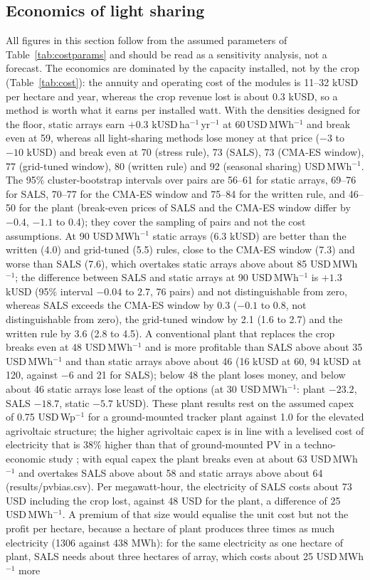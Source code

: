 \subsection{Economics of light sharing}\label{sec:cost}
All figures in this section follow from the assumed parameters of Table~\ref{tab:costparams} and should be read as a sensitivity analysis, not a forecast. The economics are dominated by the capacity installed, not by the crop (Table~\ref{tab:cost}): the annuity and operating cost of the modules is 11--32 kUSD per hectare and year, whereas the crop revenue lost is about 0.3 kUSD, so a method is worth what it earns per installed watt. With the densities designed for the floor, static arrays earn $+0.3$ kUSD\,ha$^{-1}$\,yr$^{-1}$ at 60\,USD\,MWh$^{-1}$ and break even at 59, whereas all light-sharing methods lose money at that price ($-3$ to $-10$ kUSD) and break even at 70 (stress rule), 73 (SALS), 73 (CMA-ES window), 77 (grid-tuned window), 80 (written rule) and 92 (seasonal sharing) USD\,MWh$^{-1}$. The 95\% cluster-bootstrap intervals over pairs are 56--61 for static arrays, 69--76 for SALS, 70--77 for the CMA-ES window and 75--84 for the written rule, and 46--50 for the plant (break-even prices of SALS and the CMA-ES window differ by $-0.4$, $-1.1$ to 0.4); they cover the sampling of pairs and not the cost assumptions. At 90 USD\,MWh$^{-1}$ static arrays (6.3 kUSD) are better than the written (4.0) and grid-tuned (5.5) rules, close to the CMA-ES window (7.3) and worse than SALS (7.6), which overtakes static arrays above about 85 USD\,MWh$^{-1}$; the difference between SALS and static arrays at 90 USD\,MWh$^{-1}$ is $+1.3$ kUSD (95\% interval $-0.04$ to $2.7$, 76 pairs) and not distinguishable from zero, whereas SALS exceeds the CMA-ES window by 0.3 ($-0.1$ to 0.8, not distinguishable from zero), the grid-tuned window by 2.1 (1.6 to 2.7) and the written rule by 3.6 (2.8 to 4.5). A conventional plant that replaces the crop breaks even at 48 USD\,MWh$^{-1}$ and is more profitable than SALS above about 35 USD\,MWh$^{-1}$ and than static arrays above about 46 (16 kUSD at 60, 94 kUSD at 120, against $-6$ and 21 for SALS); below 48 the plant loses money, and below about 46 static arrays lose least of the options (at 30 USD\,MWh$^{-1}$: plant $-23.2$, SALS $-18.7$, static $-5.7$ kUSD). These plant results rest on the assumed capex of 0.75 USD\,Wp$^{-1}$ for a ground-mounted tracker plant against 1.0 for the elevated agrivoltaic structure; the higher agrivoltaic capex is in line with a levelised cost of electricity that is 38\% higher than that of ground-mounted PV in a techno-economic study \citep{schindele2020}; with equal capex the plant breaks even at about 63 USD\,MWh$^{-1}$ and overtakes SALS above about 58 and static arrays above about 64 (results/pvbias.csv). Per megawatt-hour, the electricity of SALS costs about 73 USD including the crop lost, against 48 USD for the plant, a difference of 25 USD\,MWh$^{-1}$. A premium of that size would equalise the unit cost but not the profit per hectare, because a hectare of plant produces three times as much electricity (1306 against 438 MWh): for the same electricity as one hectare of plant, SALS needs about three hectares of array, which costs about 25 USD\,MWh$^{-1}$ more 
